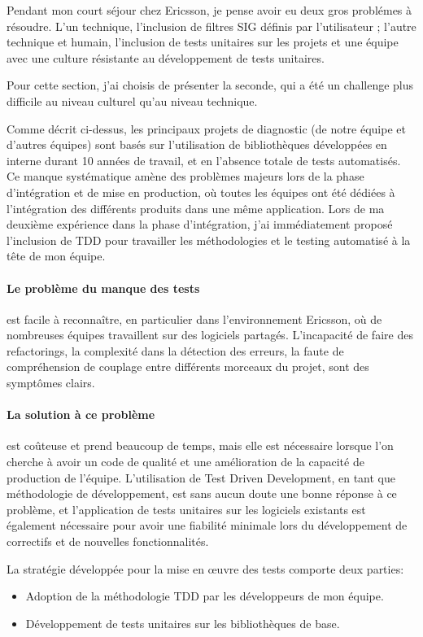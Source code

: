 \documentclass{resume} %
\begin{document}
	Pendant mon court séjour chez Ericsson, je pense avoir eu deux gros problémes à résoudre. L'un technique, l'inclusion de filtres SIG définis par l'utilisateur ; l'autre technique et humain, l'inclusion de tests unitaires sur les projets et une équipe avec une culture résistante au développement de tests unitaires.
	
Pour cette section, j'ai choisis de présenter la seconde, qui a été un challenge plus difficile au niveau culturel qu'au niveau technique. 

Comme décrit ci-dessus, les principaux projets de diagnostic (de notre équipe et d'autres équipes) sont basés sur l'utilisation de bibliothèques développées en interne durant 10 années de travail, et en l'absence totale de tests automatisés.
Ce manque systématique amène des problèmes majeurs lors de la phase d'intégration et de mise en production, où toutes les équipes ont été dédiées à l'intégration des différents produits dans une même application.
Lors de ma deuxième expérience dans la phase d'intégration, j'ai immédiatement proposé l'inclusion de TDD pour travailler les méthodologies et le testing automatisé à la tête de mon équipe.

\paragraph {Le problème du manque des tests} est facile à reconnaître, en particulier dans l'environnement Ericsson, où de nombreuses équipes travaillent sur des logiciels partagés. L'incapacité de faire des refactorings, la complexité dans la détection des erreurs, la faute de compréhension de couplage entre différents morceaux du projet, sont des symptômes clairs. 

\paragraph {La solution à ce problème} est coûteuse et prend beaucoup de temps, mais elle est nécessaire lorsque l'on cherche à avoir un code de qualité et une amélioration de la capacité de production de l'équipe. L'utilisation de Test Driven Development, en tant que méthodologie de développement, est sans aucun doute une bonne réponse à ce problème, et l'application de tests unitaires sur les logiciels existants est également nécessaire pour avoir une fiabilité minimale lors du développement de correctifs et de nouvelles fonctionnalités.

La stratégie développée pour la mise en œuvre des tests comporte deux parties:
\begin {itemize}
\item Adoption de la méthodologie TDD par les développeurs de mon équipe.
\item Développement de tests unitaires sur les bibliothèques de base.
\end {itemize}
\end{document}
